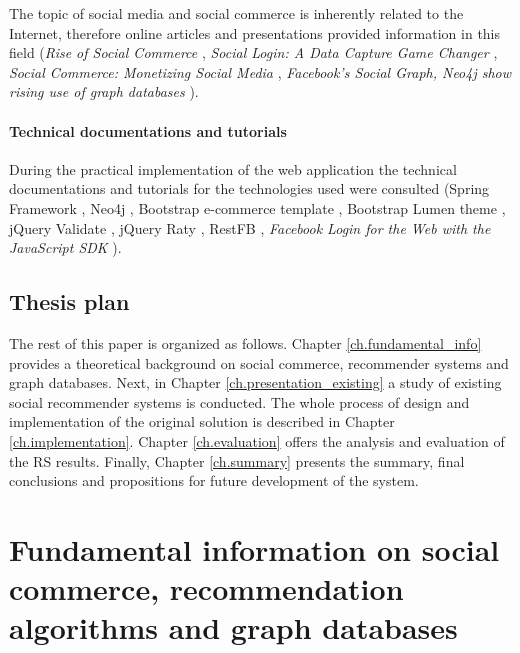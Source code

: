 \documentclass[12pt]{report}
\begin{document}
The topic of social media and social commerce is inherently related to the Internet, therefore online articles and presentations provided information in this field (\textit{Rise of Social Commerce} \cite{rise_of_social_commerce}, \textit{Social Login: A Data Capture Game Changer} \cite{social_login}, \textit{Social Commerce: Monetizing Social Media} \cite{social_commerce_syzygy}, \textit{Facebook's Social Graph, Neo4j show rising use of graph databases} \cite{facebook_social_graph}).

\subsubsection{Technical documentations and tutorials}

During the practical implementation of the web application the technical documentations and tutorials for the technologies used were consulted (Spring Framework \cite{spring_framework}, Neo4j \cite{neo4j}, Bootstrap e-commerce template \cite{bootply_ecommerce}, Bootstrap Lumen theme \cite{lumen}, jQuery Validate \cite{jquery_validate}, jQuery Raty \cite{jquery_raty}, RestFB \cite{restfb}, \textit{Facebook Login for the Web with the JavaScript SDK} \cite{facebook_login_web}). 


\section{Thesis plan}

The rest of this paper is organized as follows. Chapter \ref{ch.fundamental_info} provides a theoretical background on social commerce, recommender systems and graph databases. Next, in Chapter \ref{ch.presentation_existing} a study of existing social recommender systems is conducted. The whole process of design and implementation of the original solution is described in Chapter \ref{ch.implementation}. Chapter \ref{ch.evaluation} offers the analysis and evaluation of the RS results. Finally, Chapter \ref{ch.summary} presents the summary, final conclusions and propositions for future development of the system.



\chapter{Fundamental information on social commerce, recommendation algorithms and graph databases}
\label{ch.fundamental_info}
\end{document}
